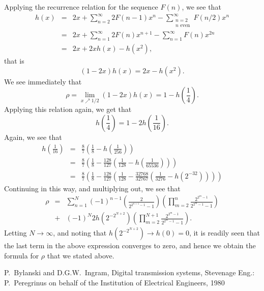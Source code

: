 \documentclass[12pt]{article}
\begin{document}
Applying the recurrence relation for the sequence $F(n)$,
we see that
\begin{eqnarray*} 
  h(x)
  &=& 
  2x +
  \sum_{n=2}^\infty 2F(n-1) x^n - 
  \sum_{\substack{n=2\\\text{$n$ even}}}^\infty F(n/2) x^n \\
  &=&
  2x +
  \sum_{n=1}^\infty 2 F(n) x^{n+1} - \sum_{n=1}^\infty F(n) x^{2n} \\
  &=&
  2x + 2x h(x) - h(x^2) ,
\end{eqnarray*}
that is
$$ (1-2x) h(x) = 2x - h(x^2) .$$
We see immediately that
$$ \rho = \lim_{x\nearrow1/2} (1-2x) h(x) = 1 - h(\textstyle \frac14) .$$
Applying this relation again, we get that
$$ \textstyle h(\frac14) = 1 - 2 h(\frac1{16}) .$$
Again, we see that
\begin{eqnarray*}
   \textstyle
   h(\frac1{16}) 
   &=& 
   \textstyle
   \frac87(\frac18-h(\frac1{256})) \\
   &=&
   \textstyle
   \frac87(\frac18-\frac{128}{127}(\frac1{128}-h(\frac1{65536}))) \\
   &=&
   \textstyle
   \frac87(\frac18-\frac{128}{127}(\frac1{128}-
   \frac{32768}{32767}(\frac1{3276}-h(2^{-32}))))
\end{eqnarray*}
Continuing in this way, and multiplying out, we see that
\begin{eqnarray*}
  \rho &=& 
  \sum_{n=1}^N (-1)^{n-1}
  \left(\frac2{2^{2^{n+1}-1}-1}\right)
  \left(\prod_{m=2}^n \frac{2^{2^m-1}}{2^{2^m-1}-1}\right) \\
  &+& (-1)^N 2 h(2^{-2^{N+2}})
  \left(\prod_{m=2}^{N+1} \frac{2^{2^m-1}}{2^{2^m-1}-1}\right)  .
\end{eqnarray*}
Letting $N\to\infty$, and noting that $h(2^{-2^{N+2}}) \to h(0)=0$, 
it is readily seen that the last term in the above expression
converges to zero, and hence we obtain the formula for $\rho$ that we 
stated above.

\begin{thebibliography}{999}

 P.~Bylanski and D.G.W.~Ingram, Digital transmission systems,
Stevenage Eng.: P.~Peregrinus on behalf of the Institution of 
Electrical Engineers, 1980

\end{thebibliography}
\end{document}
